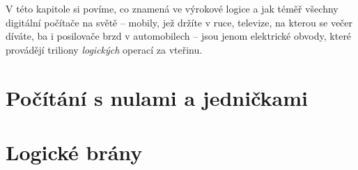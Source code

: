 V této kapitole si povíme, co znamená  ve výrokové logice a jak
téměř všechny digitální počítače na světě -- mobily, jež držíte v ruce,
televize, na kterou se večer díváte, ba i posilovače brzd v automobilech -- jsou
jenom elektrické obvody, které provádějí triliony \emph{logických} operací za
vteřinu.

\section{Počítání s nulami a jedničkami}
\label{sec:pocitani-s-nulami-a-jednickami}



\section{Logické brány}
\label{sec:logicke-brany}


